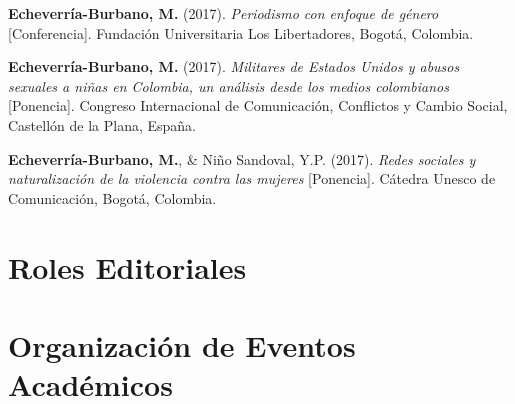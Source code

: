 \documentclass[11pt,a4paper,]{awesome-cv}
\begin{document}
\textbf{Echeverría-Burbano, M.} (2017). \emph{Periodismo con enfoque de
género} {[}Conferencia{]}. Fundación Universitaria Los Libertadores,
Bogotá, Colombia.

\textbf{Echeverría-Burbano, M.} (2017). \emph{Militares de Estados
Unidos y abusos sexuales a niñas en Colombia, un análisis desde los
medios colombianos} {[}Ponencia{]}. Congreso Internacional de
Comunicación, Conflictos y Cambio Social, Castellón de la Plana, España.

\textbf{Echeverría-Burbano, M.}, \& Niño Sandoval, Y.P. (2017).
\emph{Redes sociales y naturalización de la violencia contra las
mujeres} {[}Ponencia{]}. Cátedra Unesco de Comunicación, Bogotá,
Colombia.

\endgroup

\hypertarget{roles-editoriales}{%
\section{Roles Editoriales}\label{roles-editoriales}}

\begin{cventries}
\end{cventries}

\hypertarget{organizaciuxf3n-de-eventos-acaduxe9micos}{%
\section{Organización de Eventos
Académicos}\label{organizaciuxf3n-de-eventos-acaduxe9micos}}

\begin{cventries}
    \vspace{-4.0mm}
    \vspace{-4.0mm}
    \vspace{-4.0mm}
    \vspace{-4.0mm}
    \vspace{-4.0mm}
    \vspace{-4.0mm}
\end{cventries}
\end{document}
